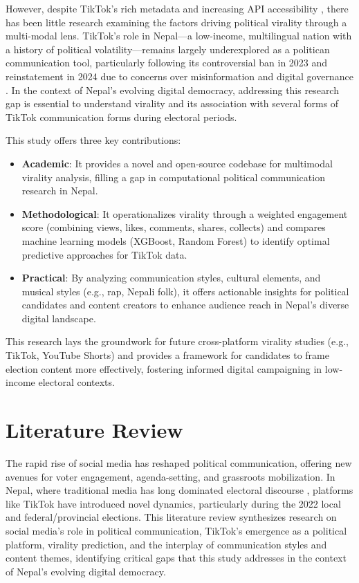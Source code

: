 \documentclass[12pt,a4paper]{report}
\begin{document}
However, despite TikTok’s rich metadata and increasing API accessibility \parencite{tiktokResearchAPI2025}, there has been little research examining the factors driving political virality through a multi-modal lens. TikTok’s role in Nepal—a low-income, multilingual nation with a history of political volatility—remains largely underexplored as a politican communication tool, particularly following its controversial ban in 2023 and reinstatement in 2024 due to concerns over misinformation and digital governance \parencite{lamichhane2024tik, reuters2024tiktok}. In the context of Nepal’s evolving digital democracy, addressing this research gap is essential to understand virality and its association with several forms of TikTok communication forms   during electoral periods. 

This study offers three key contributions:
\begin{itemize}
    \item \textbf{Academic}: It provides a novel and open-source codebase for multimodal virality analysis, filling a gap in computational political communication research in Nepal.
    \item \textbf{Methodological}: It operationalizes virality through a weighted engagement score (combining views, likes, comments, shares, collects) and compares machine learning models (XGBoost, Random Forest) to identify optimal predictive approaches for TikTok data.
\newpage
    \item \textbf{Practical}: By analyzing communication styles, cultural elements, and musical styles (e.g., rap, Nepali folk), it offers actionable insights for political candidates and content creators to enhance audience reach in Nepal’s diverse digital landscape.
\end{itemize}

This research lays the groundwork for future cross-platform virality studies (e.g., TikTok, YouTube Shorts) and provides a framework for candidates to frame election content more effectively, fostering informed digital campaigning in low-income electoral contexts.
\newpage

\chapter{Literature Review}
The rapid rise of social media has reshaped political communication, offering new avenues for voter engagement, agenda-setting, and grassroots mobilization. In Nepal, where traditional media has long dominated electoral discourse \parencite{dahal2023influence}, platforms like TikTok have introduced novel dynamics, particularly during the 2022 local and federal/provincial elections. This literature review synthesizes research on social media’s role in political communication, TikTok’s emergence as a political platform, virality prediction, and the interplay of communication styles and content themes, identifying critical gaps that this study addresses in the context of Nepal’s evolving digital democracy.
\end{document}
